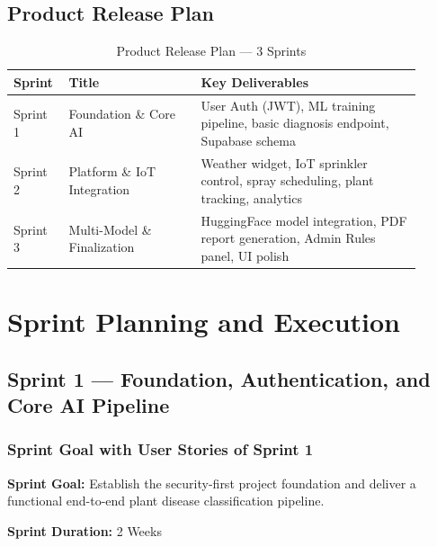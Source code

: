 \documentclass[12pt,a4paper]{report}
\begin{document}
\section{Product Release Plan}

\begin{table}[H]
\centering
\caption{Product Release Plan — 3 Sprints}
\label{tab:release}
\begin{tabular}{p{0.1\linewidth} p{0.3\linewidth} p{0.5\linewidth}}
\toprule
\textbf{Sprint} & \textbf{Title} & \textbf{Key Deliverables} \\
\midrule
Sprint 1 & Foundation \& Core AI & User Auth (JWT), ML training pipeline, basic diagnosis endpoint, Supabase schema \\[6pt]
Sprint 2 & Platform \& IoT Integration & Weather widget, IoT sprinkler control, spray scheduling, plant tracking, analytics \\[6pt]
Sprint 3 & Multi-Model \& Finalization & HuggingFace model integration, PDF report generation, Admin Rules panel, UI polish \\
\bottomrule
\end{tabular}
\end{table}

\newpage

\chapter{Sprint Planning and Execution}

\section{Sprint 1 --- Foundation, Authentication, and Core AI Pipeline}

\subsection{Sprint Goal with User Stories of Sprint 1}
\textbf{Sprint Goal:} Establish the security-first project foundation and deliver a functional end-to-end plant disease classification pipeline.

\textbf{Sprint Duration:} 2 Weeks
\end{document}
